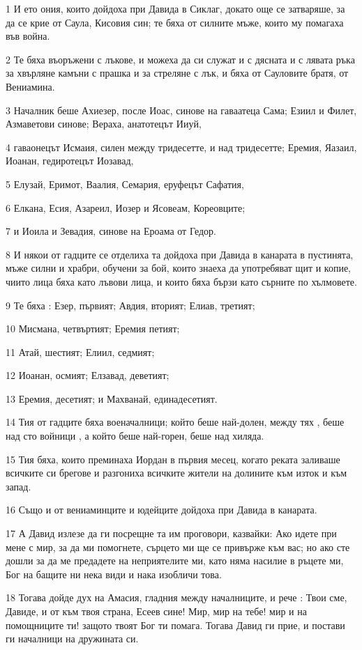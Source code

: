 \par 1 И ето ония, които дойдоха при Давида в Сиклаг, докато още се затваряше, за да се крие от Саула, Кисовия син; те бяха от силните мъже, които му помагаха във война.
\par 2 Те бяха въоръжени с лъкове, и можеха да си служат и с дясната и с лявата ръка за хвърляне камъни с прашка и за стреляне с лък, и бяха от Сауловите братя, от Вениамина.
\par 3 Началник беше Ахиезер, после Иоас, синове на гаваатеца Сама; Езиил и Филет, Азмаветови синове; Вераха, анатотецът Ииуй,
\par 4 гаваонецът Исмаия, силен между тридесетте, и над тридесетте; Еремия, Яазаил, Иоанан, гедиротецът Иозавад,
\par 5 Елузай, Еримот, Ваалия, Семария, еруфецът Сафатия,
\par 6 Елкана, Есия, Азареил, Иозер и Ясовеам, Кореовците;
\par 7 и Иоила и Зевадия, синове на Ероама от Гедор.
\par 8 И някои от гадците се отделиха та дойдоха при Давида в канарата в пустинята, мъже силни и храбри, обучени за бой, които знаеха да употребяват щит и копие, чиито лица бяха като лъвови лица, и които бяха бързи като сърните по хълмовете.
\par 9 Те бяха : Езер, първият; Авдия, вторият; Елиав, третият;
\par 10 Мисмана, четвъртият; Еремия петият;
\par 11 Атай, шестият; Елиил, седмият;
\par 12 Иоанан, осмият; Елзавад, деветият;
\par 13 Еремия, десетият; и Махванай, единадесетият.
\par 14 Тия от гадците бяха военачалници; който беше най-долен, между тях , беше над сто войници , а който беше най-горен, беше над хиляда.
\par 15 Тия бяха, които преминаха Иордан в първия месец, когато реката заливаше всичките си брегове и разгониха всичките жители на долините към изток и към запад.
\par 16 Също и от вениаминците и юдейците дойдоха при Давида в канарата.
\par 17 А Давид излезе да ги посрещне та им проговори, казвайки: Ако идете при мене с мир, за да ми помогнете, сърцето ми ще се привърже към вас; но ако сте дошли за да ме предадете на неприятелите ми, като няма насилие в ръцете ми, Бог на бащите ни нека види и нака изобличи това.
\par 18 Тогава дойде дух на Амасия, гладния между началниците, и рече : Твои сме, Давиде, и от към твоя страна, Есеев сине! Мир, мир на тебе! мир и на помощниците ти! защото твоят Бог ти помага. Тогава Давид ги прие, и постави ги началници на дружината си.
